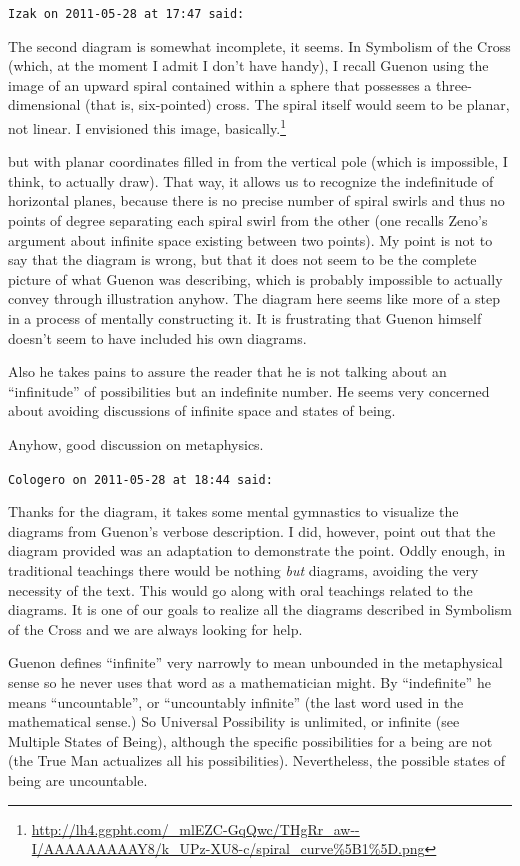 \begin{footnotesize}
\begin{sffamily}

\texttt{Izak on 2011-05-28 at 17:47 said:}

The second diagram is somewhat incomplete, it seems. In Symbolism of the Cross (which, at the moment I admit I don't have handy), I recall Guenon using the image of an upward spiral contained within a sphere that possesses a three-dimensional (that is, six-pointed) cross. The spiral itself would seem to be planar, not linear. I envisioned this image, basically.\footnote{\url{http://lh4.ggpht.com/\_mlEZC-GqQwc/THgRr\_aw--I/AAAAAAAAAY8/k\_UPz-XU8-c/spiral\_curve\%5B1\%5D.png}}

but with planar coordinates filled in from the vertical pole (which is impossible, I think, to actually draw). That way, it allows us to recognize the indefinitude of horizontal planes, because there is no precise number of spiral swirls and thus no points of degree separating each spiral swirl from the other (one recalls Zeno's argument about infinite space existing between two points). My point is not to say that the diagram is wrong, but that it does not seem to be the complete picture of what Guenon was describing, which is probably impossible to actually convey through illustration anyhow. The diagram here seems like more of a step in a process of mentally constructing it. It is frustrating that Guenon himself doesn't seem to have included his own diagrams.

Also he takes pains to assure the reader that he is not talking about an ``infinitude'' of possibilities but an indefinite number. He seems very concerned about avoiding discussions of infinite space and states of being.

Anyhow, good discussion on metaphysics.

\hfill

\texttt{Cologero on 2011-05-28 at 18:44 said:}

Thanks for the diagram, it takes some mental gymnastics to visualize the diagrams from Guenon's verbose description. I did, however, point out that the diagram provided was an adaptation to demonstrate the point. Oddly enough, in traditional teachings there would be nothing \emph{but} diagrams, avoiding the very necessity of the text. This would go along with oral teachings related to the diagrams. It is one of our goals to realize all the diagrams described in Symbolism of the Cross and we are always looking for help.

Guenon defines ``infinite'' very narrowly to mean unbounded in the metaphysical sense so he never uses that word as a mathematician might. By ``indefinite'' he means ``uncountable'', or ``uncountably infinite'' (the last word used in the mathematical sense.) So Universal Possibility is unlimited, or infinite (see Multiple States of Being), although the specific possibilities for a being are not (the True Man actualizes all his possibilities). Nevertheless, the possible states of being are uncountable.

\hfill

\end{sffamily}
\end{footnotesize}

